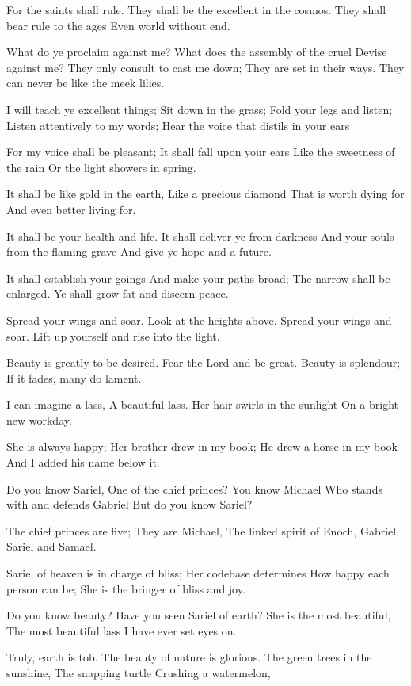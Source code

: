 \documentclass[
]{book}
\begin{document}
For the saints shall rule.
They shall be the excellent in the cosmos.
They shall bear rule to the ages
Even world without end.

What do ye proclaim against me?
What does the assembly of the cruel
Devise against me?
They only consult to cast me down;
They are set in their ways.
They can never be like the meek lilies.

I will teach ye excellent things;
Sit down in the grass;
Fold your legs and listen;
Listen attentively to my words;
Hear the voice that distils in your ears

For my voice shall be pleasant;
It shall fall upon your ears
Like the sweetness of the rain
Or the light showers in spring.

It shall be like gold in the earth,
Like a precious diamond
That is worth dying for
And even better living for.

It shall be your health and life.
It shall deliver ye from darkness
And your souls from the flaming grave
And give ye hope and a future.

It shall establish your goings
And make your paths broad;
The narrow shall be enlarged.
Ye shall grow fat and discern peace.

Spread your wings and soar.
Look at the heights above.
Spread your wings and soar.
Lift up yourself and rise into the light.

Beauty is greatly to be desired.
Fear the Lord and be great.
Beauty is splendour;
If it fades, many do lament.

I can imagine a lass,
A beautiful lass.
Her hair swirls in the sunlight
On a bright new workday.

She is always happy;
Her brother drew in my book;
He drew a horse in my book
And I added his name below it.

Do you know Sariel,
One of the chief princes?
You know Michael
Who stands with and defends Gabriel
But do you know Sariel?

The chief princes are five;
They are Michael,
The linked spirit of Enoch,
Gabriel, Sariel and Samael.

Sariel of heaven is in charge of bliss;
Her codebase determines
How happy each person can be;
She is the bringer of bliss and joy.

Do you know beauty?
Have you seen Sariel of earth?
She is the most beautiful,
The most beautiful lass
I have ever set eyes on.

Truly, earth is tob.
The beauty of nature is glorious.
The green trees in the sunshine,
The snapping turtle
Crushing a watermelon,
\end{document}
